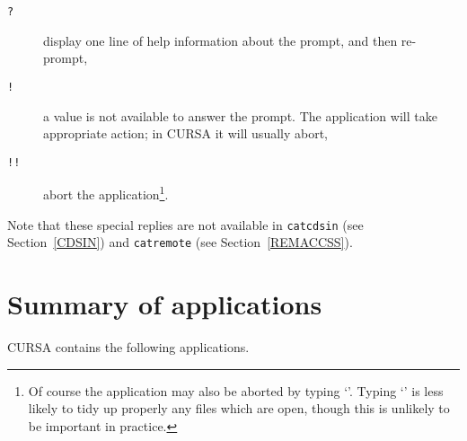 \documentclass[twoside,11pt]{article}
\newcommand{\xlabel}[1]{}
\renewcommand{\_}{\texttt{\symbol{95}}}
\begin{document}
\begin{description}

  \item[ {\tt ?} ] display one line of help information about the
   prompt, and then re-prompt,

  \item[ {\tt !} ] a value is not available to answer the prompt. The
   application will take appropriate action; in CURSA it will usually
   abort,

  \item[ {\tt !!} ] abort the application\footnote{Of course the
   application may also be aborted by typing `{\tt <Control-C>}'.
   Typing `{\tt <Control-C>}' is less likely to tidy up properly any files 
   which are open, though this is unlikely to be important in
   practice.}.

\end{description}

Note that these special replies are not available in {\tt catcdsin}
(see Section~\ref{CDSIN}) and {\tt catremote} (see Section~\ref{REMACCSS}).


\section{\xlabel{SUMMARY}Summary of applications}

CURSA contains the following applications.
\end{document}
